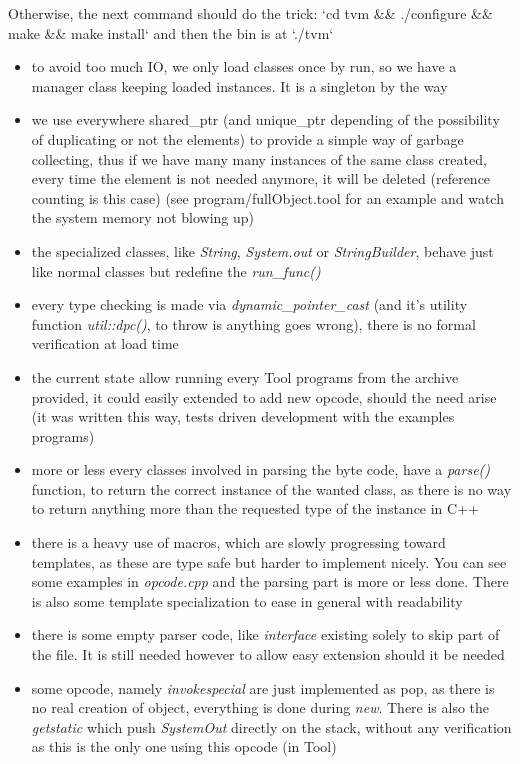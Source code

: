 Otherwise, the next command should do the trick:
`cd tvm \&\& ./configure \&\& make \&\& make install` and then the bin is at
`./tvm`

\begin{itemize}
	\item to avoid too much IO, we only load classes once by run, so we have
		a manager class keeping loaded instances. It is a singleton by
		the way
	\item we use everywhere shared\_ptr (and unique\_ptr depending of the
		possibility of duplicating or not the elements) to provide a
		simple way of garbage collecting, thus if we have many many
		instances of the same class created, every time the element is
		not needed anymore, it will be deleted (reference counting is
		this case) (see program/fullObject.tool for an example and watch
		the system memory not blowing up)

	\item the specialized classes, like \emph{String}, \emph{System.out} or
		\emph{StringBuilder}, behave just like normal classes but
		redefine the \emph{run\_func()}

	\item every type checking is made via \emph{dynamic\_pointer\_cast}
		(and it's utility function \emph{util::dpc()}, to throw is
		anything goes wrong), there is no formal verification at load
		time

	\item the current state allow running every Tool programs from the
		archive provided, it could easily extended to add new opcode,
		should the need arise (it was written this way, tests driven
		development with the examples programs)

	\item more or less every classes involved in parsing the byte code, have
		a \emph{parse()} function, to return the correct instance of the
		wanted class, as there is no way to return anything more than
		the requested type of the instance in C++

	\item there is a heavy use of macros, which are slowly progressing
		toward templates, as these are type safe but harder to implement
		nicely. You can see some examples in \emph{opcode.cpp} and the
		parsing part is more or less done. There is also some template
		specialization to ease in general with readability

	\item there is some empty parser code, like \emph{interface} existing
		solely to skip part of the file. It is still needed however to
		allow easy extension should it be needed

	\item some opcode, namely \emph{invokespecial} are just implemented as
		pop, as there is no real creation of object, everything is done
		during \emph{new}. There is also the \emph{getstatic} which push
		\emph{SystemOut} directly on the stack, without any verification
		as this is the only one using this opcode (in Tool)
\end{itemize}
